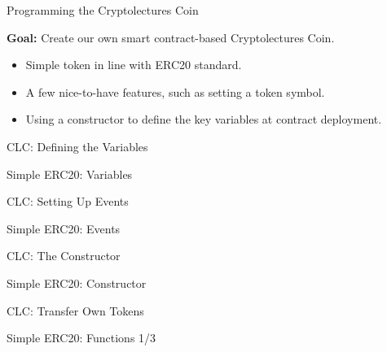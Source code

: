 \documentclass[handout]{beamer}
\begin{document}
\begin{frame}{Programming the Cryptolectures Coin}

\textbf{Goal: }Create our own smart contract-based Cryptolectures Coin.
\vspace{1.5em}

\centering
	\begin{tikzpicture}[scale=1.5, every node/.style={scale=1.5}]
			
	\end{tikzpicture}

\vspace{1em}
\begin{itemize}
	\item Simple token in line with ERC20 standard.
	\item A few nice-to-have features, such as setting a token symbol.
	\item Using a constructor to define the key variables at contract deployment.
\end{itemize}


\end{frame}

\begin{frame}{CLC: Defining the Variables}

	\begin{samplecode}{Simple ERC20: Variables}
		
	\end{samplecode}

\end{frame}


\begin{frame}{CLC: Setting Up Events}

	\begin{samplecode}{Simple ERC20: Events}
		
	\end{samplecode}

\end{frame}

\begin{frame}{CLC: The Constructor}

	\begin{samplecode}{Simple ERC20: Constructor}
		
	\end{samplecode}

\end{frame}

\begin{frame}{CLC: Transfer Own Tokens}

	\begin{samplecode}{Simple ERC20: Functions 1/3}
		
	\end{samplecode}

\end{frame}
\end{document}
